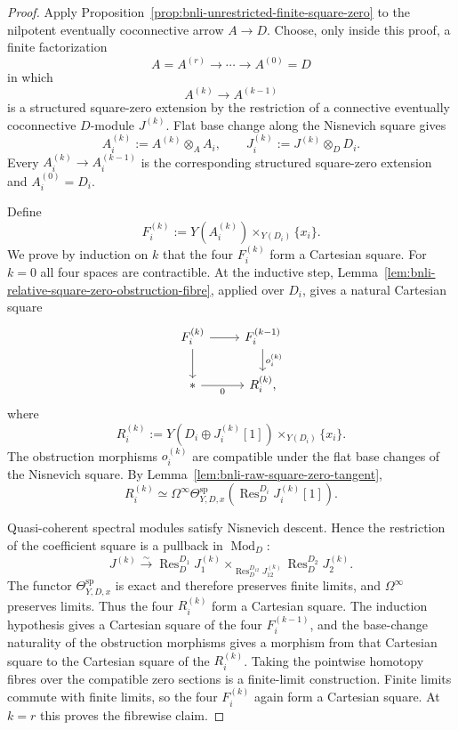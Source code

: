 \begin{proof}
Apply Proposition~\ref{prop:bnli-unrestricted-finite-square-zero} to the
nilpotent eventually coconnective arrow $A\to D$.  Choose, only inside this
proof, a finite factorization
\[
    A=A^{(r)}
    \longrightarrow\cdots\longrightarrow
    A^{(0)}=D
\]
in which
\[
    A^{(k)}\longrightarrow A^{(k-1)}
\]
is a structured square-zero extension by the restriction of a connective
eventually coconnective $D$-module $J^{(k)}$.  Flat base change along the
Nisnevich square gives
\[
    A_i^{(k)}
    :=
    A^{(k)}\otimes_AA_i,
    \qquad
    J_i^{(k)}
    :=
    J^{(k)}\otimes_DD_i.
\]
Every
$A_i^{(k)}\to A_i^{(k-1)}$
is the corresponding structured square-zero extension and
$A_i^{(0)}=D_i$.

Define
\[
    F_i^{(k)}
    :=
    Y(A_i^{(k)})
    \times_{Y(D_i)}
    \{x_i\}.
\]
We prove by induction on $k$ that the four $F_i^{(k)}$ form a Cartesian
square.  For $k=0$ all four spaces are contractible.  At the inductive step,
Lemma~\ref{lem:bnli-relative-square-zero-obstruction-fibre}, applied over
$D_i$, gives a natural Cartesian square
\[
\begin{tikzcd}
F_i^{(k)} \arrow[r] \arrow[d] &
F_i^{(k-1)} \arrow[d,"o_i^{(k)}"]\\
* \arrow[r,"0"'] &
R_i^{(k)},
\end{tikzcd}
\]
where
\[
    R_i^{(k)}
    :=
    Y(D_i\oplus J_i^{(k)}[1])
    \times_{Y(D_i)}
    \{x_i\}.
\]
The obstruction morphisms $o_i^{(k)}$ are compatible under the flat base
changes of the Nisnevich square.  By
Lemma~\ref{lem:bnli-raw-square-zero-tangent},
\[
    R_i^{(k)}
    \simeq
    \Omega^\infty
    \Theta^{\mathrm{sp}}_{Y,D,x}
    \left(
      \operatorname{Res}^{D_i}_D
      J_i^{(k)}[1]
    \right).
\]

Quasi-coherent spectral modules satisfy Nisnevich descent.  Hence the
restriction of the coefficient square is a pullback in $\operatorname{Mod}_D$:
\[
\boxed{
    J^{(k)}
    \xrightarrow{\sim}
    \operatorname{Res}^{D_1}_D J_1^{(k)}
    \times_{\operatorname{Res}^{D_{12}}_D J_{12}^{(k)}}
    \operatorname{Res}^{D_2}_D J_2^{(k)}.}
\]
The functor
$\Theta^{\mathrm{sp}}_{Y,D,x}$
is exact and therefore preserves finite limits, and $\Omega^\infty$ preserves
limits.  Thus the four $R_i^{(k)}$ form a Cartesian square.  The induction
hypothesis gives a Cartesian square of the four $F_i^{(k-1)}$, and the
base-change naturality of the obstruction morphisms gives a morphism from
that Cartesian square to the Cartesian square of the $R_i^{(k)}$.  Taking the
pointwise homotopy fibres over the compatible zero sections is a finite-limit
construction.  Finite limits commute with finite limits, so the four
$F_i^{(k)}$ again form a Cartesian square.  At $k=r$ this proves the
fibrewise claim.


\end{proof}

